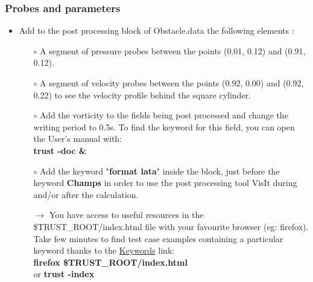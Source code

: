 \documentclass[10pt]{beamer}
\begin{document}
\begin{frame}
\frametitle{Probes and parameters}
\begin{block}{}

\begin{itemize}
\item Add to the post processing block of Obstacle.data the following elements :\\

    \begin{itemize}
    \item [$\circ$] A segment of pressure probes between the points (0.01, 0.12) and (0.91, 0.12).
    \vspace{0.1cm}

    \item [$\circ$] A segment of velocity probes between the points (0.92, 0.00) and (0.92, 0.22) to see the velocity profile behind the square cylinder.
    \vspace{0.1cm}

    \item [$\circ$] Add the vorticity to the fields being post processed and change the writing period to 0.5s. To find the keyword for this field, you can open the User's manual with:\\
    \textbf{trust -doc \&}
    \vspace{0.1cm}

    \item [$\circ$] Add the keyword "\textbf{format lata}" inside the block, just before the keyword \textbf{Champs} in order to use the post processing tool VisIt during and/or after the calculation.
    \vspace{0.1cm}

    \item [$\rightarrow$] You have access to useful resources in the \$TRUST\_ROOT/index.html file with your favourite browser (eg: firefox). Take few minutes to find test case examples containing a particular keyword thanks to the \underline{Keywords} link: \\
    \textbf{firefox \$TRUST\_ROOT/index.html} \\
    or \textbf{trust -index}\\
    \end{itemize}
\end{itemize}

\end{block}
\end{frame}
\end{document}

